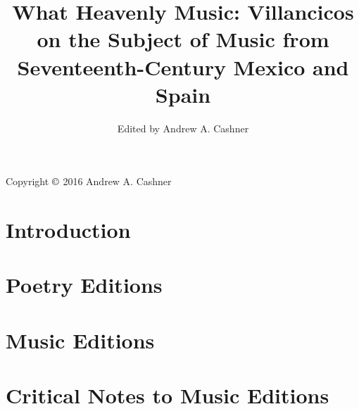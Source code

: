 \documentclass{villancico}
\begin{document}
\frontmatter
\title{What Heavenly Music: Villancicos on the Subject of Music from Seventeenth-Century Mexico and Spain}
\author{Edited by Andrew A. Cashner}
\date{}
\maketitle

\vspace*{\fill}
\begin{center}
Copyright $\copyright$ 2016 Andrew A. Cashner
\end{center}
\vspace*{\fill}
\clearpage

\tableofcontents

\mainmatter
\chapter{Introduction}

\chapter{Poetry Editions}


\chapter{Music Editions}


\chapter{Critical Notes to Music Editions}
\end{document}
